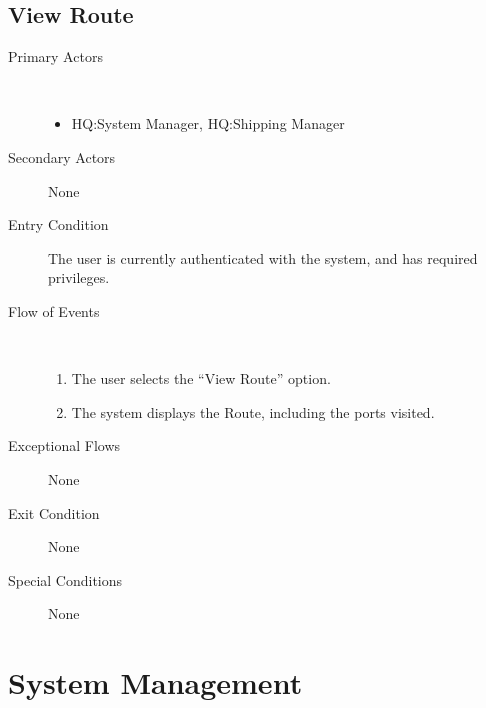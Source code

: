 \documentclass[a4paper,10pt]{report}
\begin{document}
\section{View Route}
\begin{description}
\item[Primary Actors] \
  \begin{itemize}
  \item HQ:System Manager, HQ:Shipping Manager
  \end{itemize}
\item[Secondary Actors] None
\item[Entry Condition]
  The user is currently authenticated with the system, and has required privileges.
\item[Flow of Events] \
  \begin{enumerate}
  \item The user selects the ``View Route'' option.
  \item The system displays the Route, including the ports visited.
  \end{enumerate}
\item[Exceptional Flows] None
\item[Exit Condition] None
\item[Special Conditions] None
\end{description}


\chapter{System Management}
\end{document}
